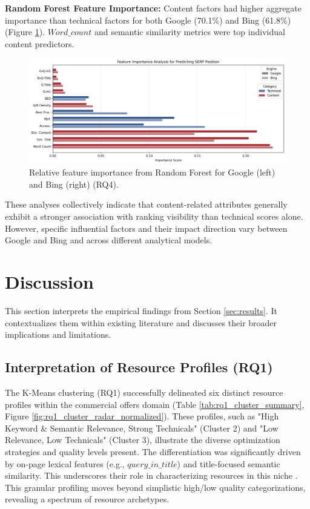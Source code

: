 \documentclass[a4paper,fleqn]{cas-sc}
\begin{document}
\textbf{Random Forest Feature Importance:} Content factors had higher aggregate importance than technical factors for both Google (70.1\%) and Bing (61.8\%) (Figure \ref{fig:rq4_feature_importance_combined}). $Word\_count$ and semantic similarity metrics were top individual content predictors.

\begin{figure}[htbp!]
\centering
\includegraphics[width=1\linewidth]{figs/rq4_feature_importance_combined.png}
\caption{Relative feature importance from Random Forest for Google (left) and Bing (right) (RQ4).}
\label{fig:rq4_feature_importance_combined}
\end{figure}

These analyses collectively indicate that content-related attributes generally exhibit a stronger association with ranking visibility than technical scores alone. However, specific influential factors and their impact direction vary between Google and Bing and across different analytical models.


\section{Discussion}
\label{sec:discussion}
This section interprets the empirical findings from Section \ref{sec:results}. It contextualizes them within existing literature and discusses their broader implications and limitations.

\subsection{Interpretation of Resource Profiles (RQ1)}
\label{subsec:discussion_rq1}
The K-Means clustering (RQ1) successfully delineated six distinct resource profiles within the commercial offers domain (Table \ref{tab:rq1_cluster_summary}, Figure \ref{fig:rq1_cluster_radar_normalized}). These profiles, such as "High Keyword \& Semantic Relevance, Strong Technicals" (Cluster 2) and "Low Relevance, Low Technicals" (Cluster 3), illustrate the diverse optimization strategies and quality levels present. The differentiation was significantly driven by on-page lexical features (e.g., $query\_in\_title$) and title-focused semantic similarity. This underscores their role in characterizing resources in this niche \citep{Yu2024}. This granular profiling moves beyond simplistic high/low quality categorizations, revealing a spectrum of resource archetypes.
\end{document}
